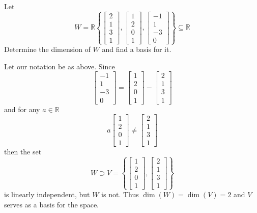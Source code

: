 \documentclass{article}
\begin{document}
\setcounter{problem}{204}
\begin{problem}
Let \[W = \mathbb{R}
\left\{
\begin{bmatrix}
2\\
1\\
3\\
1
\end{bmatrix},
\begin{bmatrix}
1\\
2\\
0\\
1
\end{bmatrix},
\begin{bmatrix}
-1\\
1\\
-3\\
0
\end{bmatrix}
\right\} \subseteq \mathbb{R}
\]
Determine the dimension of $W$ and find a basis for it.
\end{problem}

\begin{solution}
Let our notation be as above. Since 
\[
\begin{bmatrix}
-1\\
1\\
-3\\
0
\end{bmatrix}
=
\begin{bmatrix}
1\\
2\\
0\\
1
\end{bmatrix}
-
\begin{bmatrix}
2\\
1\\
3\\
1
\end{bmatrix}
\]
and for any $a\in \mathbb{R}$
\[
a
\begin{bmatrix}
1\\
2\\
0\\
1
\end{bmatrix}
\ne
\begin{bmatrix}
2\\
1\\
3\\
1
\end{bmatrix}
\]
then the set 
\[
W \supset V=
\left\{
\begin{bmatrix}
1\\
2\\
0\\
1
\end{bmatrix}
,
\begin{bmatrix}
2\\
1\\
3\\
1
\end{bmatrix}
\right\}
\]
is linearly independent, but $W$ is not. Thus $\dim(W) = \dim(V) = 2$ and $V$ serves as a basis for the space.
\end{solution}
\end{document}
